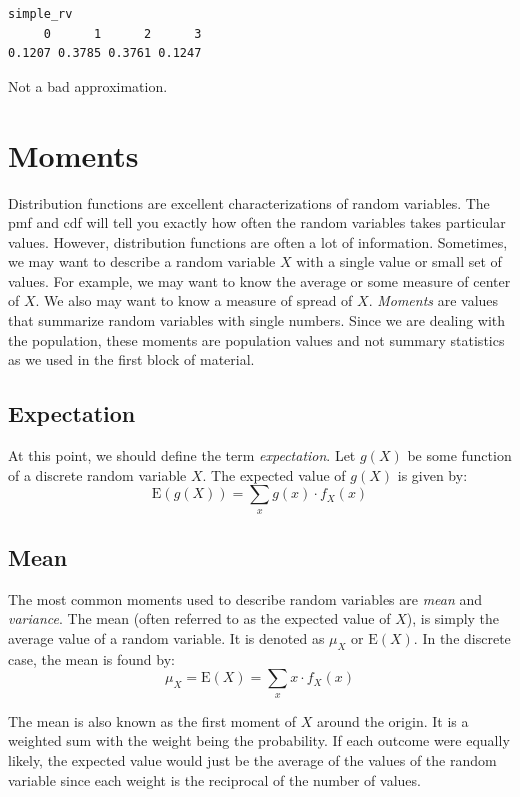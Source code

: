 \documentclass[
  letterpaper,
  DIV=11,
  numbers=noendperiod]{scrreprt}
\begin{document}
\begin{verbatim}
simple_rv
     0      1      2      3 
0.1207 0.3785 0.3761 0.1247 
\end{verbatim}

Not a bad approximation.

\section{Moments}\label{moments}

Distribution functions are excellent characterizations of random
variables. The pmf and cdf will tell you exactly how often the random
variables takes particular values. However, distribution functions are
often a lot of information. Sometimes, we may want to describe a random
variable \(X\) with a single value or small set of values. For example,
we may want to know the average or some measure of center of \(X\). We
also may want to know a measure of spread of \(X\). \emph{Moments} are
values that summarize random variables with single numbers. Since we are
dealing with the population, these moments are population values and not
summary statistics as we used in the first block of material.

\subsection{Expectation}\label{expectation}

At this point, we should define the term \emph{expectation}. Let
\(g(X)\) be some function of a discrete random variable \(X\). The
expected value of \(g(X)\) is given by: \[
\mbox{E}(g(X))=\sum_x g(x) \cdot f_X(x)
\]

\subsection{Mean}\label{mean}

The most common moments used to describe random variables are
\emph{mean} and \emph{variance}. The mean (often referred to as the
expected value of \(X\)), is simply the average value of a random
variable. It is denoted as \(\mu_X\) or \(\mbox{E}(X)\). In the discrete
case, the mean is found by: \[
\mu_X=\mbox{E}(X)=\sum_x x \cdot f_X(x)
\]

The mean is also known as the first moment of \(X\) around the origin.
It is a weighted sum with the weight being the probability. If each
outcome were equally likely, the expected value would just be the
average of the values of the random variable since each weight is the
reciprocal of the number of values.
\end{document}

